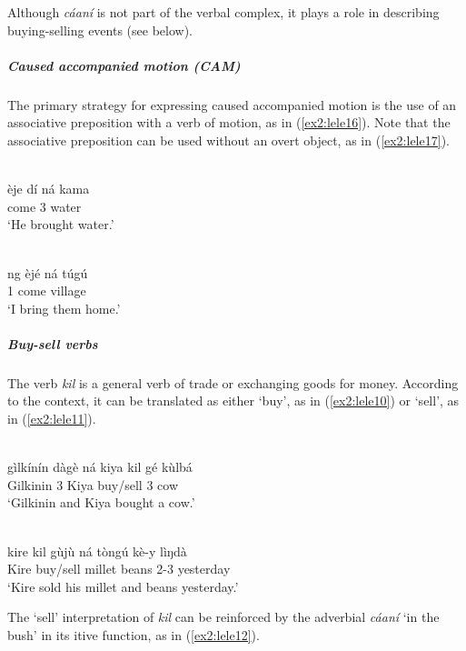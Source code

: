 Although \textit{cáaní} is not part of the verbal complex, it plays a role in describing buying-selling events (see below). 

\subparagraph{Caused accompanied motion (CAM)}

The primary strategy for expressing caused accompanied motion is the use of an associative preposition with a verb of motion, as in (\ref{ex2:lele16}). Note that the associative preposition can be used without an overt object, as in (\ref{ex2:lele17}). 

\ea\label{ex2:lele16}
 \\
\gll èje dí ná kama \\
come 3  water \\
\glt `He brought water.'

\ex\label{ex2:lele17}
 \\
\gll ng èjé ná túgú \\
1 come  village \\
\glt `I bring them home.'
\z 

\subparagraph{Buy-sell verbs}

The verb \textit{kil} is a general verb of trade or exchanging goods for money. According to the context, it can be translated as either `buy', as in (\ref{ex2:lele10}) or `sell', as in (\ref{ex2:lele11}).

\ea\label{ex2:lele10}
 \\
\gll gìlkínín dàgè ná kiya kil gé kùlbá \\
Gilkinin 3  Kiya buy/sell 3 cow \\
\glt `Gilkinin and Kiya bought a cow.'

\ex\label{ex2:lele11}
 \\
\gll kire kil gùjù ná tòngú kè-y lìŋdà \\
Kire buy/sell millet  beans 2-3 yesterday \\
\glt `Kire sold his millet and beans yesterday.'

\z 

The `sell' interpretation of \textit{kil} can be reinforced by the adverbial \textit{cáaní} `in the bush' in its itive function, as in (\ref{ex2:lele12}).

